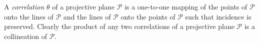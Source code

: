 A \textit{correlation} $\theta$ of a projective plane $\mathcal{P}$ is a one-to-one mapping of the points of $\mathcal{P}$ onto the lines of $\mathcal{P}$ and the lines of $\mathcal{P}$ onto the points of $\mathcal{P}$ such that incidence is preserved. Clearly the product of any two correlations of a projective plane $\mathcal{P}$ is a collineation of $\mathcal{P}$.

